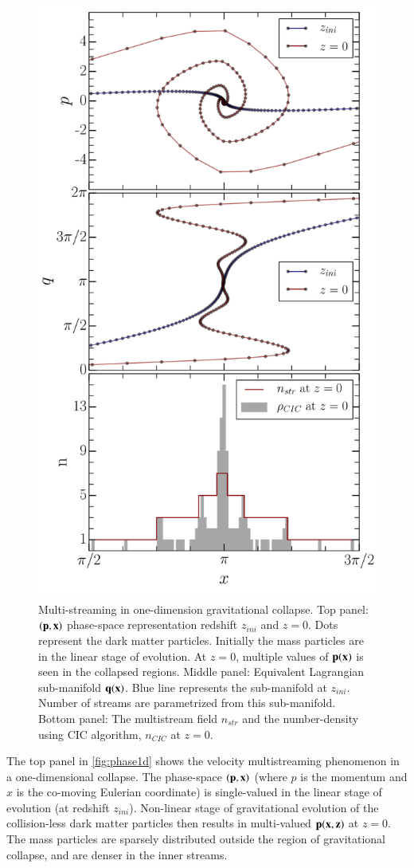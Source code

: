 \begin{figure}
\begin{minipage}[t]{.99\linewidth}
  \centering\includegraphics[width=8.cm]{Chapter4/Source_v2/fig13.pdf} 
\end{minipage}\hfill
\caption{ Multi-streaming in one-dimension gravitational collapse. Top panel: $(\bf{p}, \bf{x})$ phase-space representation redshift $z_{ini}$ and $z = 0$. Dots represent the dark matter particles. Initially the mass particles are in the linear stage of evolution. At $z = 0$, multiple values of $\bf{p}(\bf{x})$ is seen in the collapsed regions. Middle panel: Equivalent Lagrangian sub-manifold $\bf{q}(\bf{x})$. Blue line represents the sub-manifold at $z_{ini}$. Number of streams are parametrized from this sub-manifold. Bottom panel: The multistream field $n_{str}$ and the number-density using CIC algorithm, $n_{CIC}$ at $z = 0$. }
\label{fig:phase1d}
\end{figure}

The top panel in \autoref{fig:phase1d} shows the velocity multistreaming phenomenon in a one-dimensional collapse. The phase-space $(\bf{p}, \bf{x})$ (where $p$ is the momentum and $x$ is the co-moving Eulerian coordinate) is single-valued in the linear stage of evolution (at redshift $z_{ini}$). Non-linear stage of gravitational evolution of the collision-less dark matter particles then results in multi-valued $\bf{p} (\bf{x},z)$ at $z = 0$. The mass particles are sparsely  distributed outside the region of gravitational collapse, and are denser in the inner streams.

